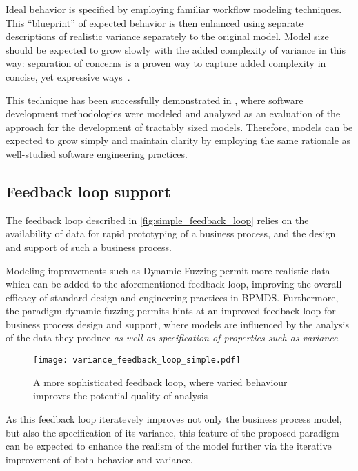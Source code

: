 \documentclass[12pt]{llncs}  %
\begin{document}
Ideal behavior is specified by employing familiar workflow
modeling techniques. This ``blueprint'' of expected behavior is then enhanced
using separate descriptions of realistic variance separately to the original model. Model
size should be expected to grow slowly with the added complexity of variance in
this way: separation of concerns is a proven way to capture added complexity in
concise, yet expressive ways~\citep{kiczales1997aspect}.
\par

This technique has been successfully demonstrated in \cite{wallis2018modelling},
where software development methodologies were modeled and analyzed as an
evaluation of the approach for the development of tractably sized models.
Therefore, models can be expected to grow simply and maintain clarity by
employing the same rationale as well-studied software engineering practices.
\par

\subsection{Feedback loop support}
The feedback loop described in \cref{fig:simple_feedback_loop} relies on the
availability of data for rapid prototyping of a business process, and the design
and support of such a business process.
\par

Modeling improvements such as Dynamic Fuzzing permit more realistic data which
can be added to the aforementioned feedback loop, improving the overall efficacy
of standard design and engineering practices in BPMDS. Furthermore, the paradigm
dynamic fuzzing permits hints at an improved feedback loop for business process
design and support, where models are influenced by the analysis of the data they
produce \emph{as well as specification of properties such as variance}. 
\par

\begin{figure}[h]
  \centering
  \texttt{[image: variance\_feedback\_loop\_simple.pdf]}
  \caption[Feedback loop with variance]{A more sophisticated feedback loop,
    where varied behaviour improves the potential quality of analysis}
  \label{fig:complex_feedback_loop}
\end{figure}

As this feedback loop iteratevely improves not only the business process model,
but also the specification of its variance, this feature of the proposed
paradigm can be expected to enhance the realism of the model further via the
iterative improvement of both behavior and variance.
\par
\end{document}
